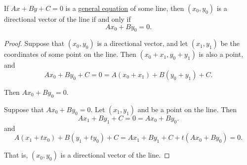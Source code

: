 \begin{proposition}\label{thm:coordinates_of_directional_vector}
  If \( A x + B y + C = 0 \) is a \hyperref[def:plane_line_equations/general]{general equation} of some line, then \( (x_0, y_0) \) is a directional vector of the line if and only if
  \begin{equation*}
    A x_0 + B y_0 = 0.
  \end{equation*}
\end{proposition}
\begin{proof}
  \SufficiencySubProof Suppose that \( (x_0, y_0) \) is a directional vector, and let \( (x_1, y_1) \) be the coordinates of some point on the line. Then \( (x_0 + x_1, y_0 + y_1) \) is also a point, and
  \begin{equation*}
    A x_0 + B y_0 + C = 0 = A (x_0 + x_1) + B (y_0 + y_1) + C.
  \end{equation*}

  Then \( A x_0 + B y_0 = 0 \).

  \NecessitySubProof Suppose that \( A x_0 + B y_0 = 0 \). Let \( (x_1, y_1) \) and be a point on the line. Then
  \begin{equation*}
    A x_1 + B y_1 + C = 0 = A x_0 + B y_0.
  \end{equation*}
  and
  \begin{equation*}
    A (x_1 + t x_0) + B (y_1 + t y_0) + C = A x_1 + B y_1 + C + t (A x_0 + B y_0) = 0.
  \end{equation*}

  That is, \( (x_0, y_0) \) is a directional vector of the line.
\end{proof}

